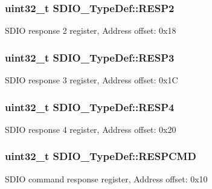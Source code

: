 \subsubsection[{\texorpdfstring{R\+E\+S\+P2}{RESP2}}]{ uint32\+\_\+t S\+D\+I\+O\+\_\+\+Type\+Def\+::\+R\+E\+S\+P2}\hypertarget{struct_s_d_i_o___type_def_a9228c8a38c07c508373644220dd322f0}{}\label{struct_s_d_i_o___type_def_a9228c8a38c07c508373644220dd322f0}
S\+D\+IO response 2 register, Address offset\+: 0x18 
\subsubsection[{\texorpdfstring{R\+E\+S\+P3}{RESP3}}]{ uint32\+\_\+t S\+D\+I\+O\+\_\+\+Type\+Def\+::\+R\+E\+S\+P3}\hypertarget{struct_s_d_i_o___type_def_a70f3e911570bd326bff852664fd8a7d5}{}\label{struct_s_d_i_o___type_def_a70f3e911570bd326bff852664fd8a7d5}
S\+D\+IO response 3 register, Address offset\+: 0x1C 
\subsubsection[{\texorpdfstring{R\+E\+S\+P4}{RESP4}}]{ uint32\+\_\+t S\+D\+I\+O\+\_\+\+Type\+Def\+::\+R\+E\+S\+P4}\hypertarget{struct_s_d_i_o___type_def_ac7b45c7672922d38ffb0a1415a122716}{}\label{struct_s_d_i_o___type_def_ac7b45c7672922d38ffb0a1415a122716}
S\+D\+IO response 4 register, Address offset\+: 0x20 
\subsubsection[{\texorpdfstring{R\+E\+S\+P\+C\+MD}{RESPCMD}}]{ uint32\+\_\+t S\+D\+I\+O\+\_\+\+Type\+Def\+::\+R\+E\+S\+P\+C\+MD}\hypertarget{struct_s_d_i_o___type_def_a9d881ed6c2fdecf77e872bcc6b404774}{}\label{struct_s_d_i_o___type_def_a9d881ed6c2fdecf77e872bcc6b404774}
S\+D\+IO command response register, Address offset\+: 0x10 

